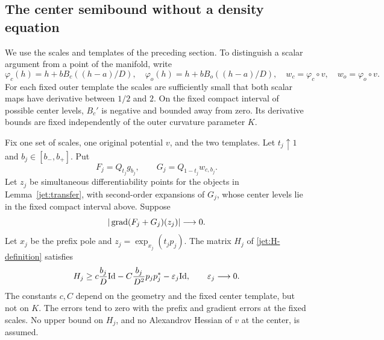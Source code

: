 \subsection{The center semibound without a density equation}

We use the scales and templates of the preceding section. To distinguish
a scalar argument from a point of the manifold, write
\[
 \varphi_c(h)=h+bB_c((h-a)/D),\quad
 \varphi_o(h)=h+bB_o((h-a)/D),\quad
 w_c=\varphi_c\circ v,\quad w_o=\varphi_o\circ v.
\]
For each fixed outer template the scales are sufficiently small that
both scalar maps have derivative between $1/2$ and $2$. On the fixed
compact interval of possible center levels, $B_c'$ is negative and
bounded away from zero. Its derivative bounds are fixed independently
of the outer curvature parameter $K$.

\begin{lemma}
\label{jet:semibound}
Fix one set of scales, one original potential $v$, and the two
templates. Let $t_j\uparrow1$ and $b_j\in[b_-,b_+]$. Put
\[
 F_j=Q_{t_j}g_{b_j},\qquad G_j=Q_{1-t_j}w_{c,b_j}.
\]
Let $z_j$ be simultaneous differentiability points for the objects in
Lemma~\ref{jet:transfer}, with second-order expansions of $G_j$, whose center levels lie in the
fixed compact interval above. Suppose
\[
 |\operatorname{grad}(F_j+G_j)(z_j)|\longrightarrow0.
\]
Let $x_j$ be the prefix pole and
$z_j=\exp_{x_j}(t_jp_j)$. The matrix $H_j$ of
\eqref{jet:H-definition} satisfies
\begin{equation}\label{jet:semibound-eq}
 H_j\ge c\frac{b_j}{D}\mathrm{Id}
       -C\frac{b_j}{D^2}p_jp_j^*-\varepsilon_j\mathrm{Id},
 \qquad \varepsilon_j\longrightarrow0.
\end{equation}
The constants $c,C$ depend on the geometry and the fixed center
template, but not on $K$. The errors tend to zero with the prefix and
gradient errors at the fixed scales. No upper bound on $H_j$, and no
Alexandrov Hessian of $v$ at the center, is assumed.
\end{lemma}

